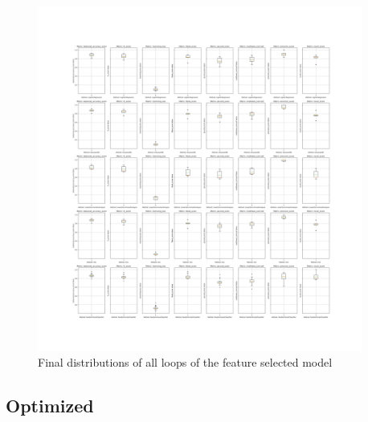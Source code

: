 \documentclass[12pt, a4paper]{article}
\begin{document}
\begin{figure}[H]
    \begin{center}
        \includegraphics[width=0.95\textwidth]{figures/RNCV/FeatureSelection/All loop outer folds boxplots.png}
        \caption{Final distributions of all loops of the feature selected model}\label{fig:fs model desc}
    \end{center}
\end{figure}

\begin{multicols}{2}

    \subsection{Optimized} \label{subsec:opted model}

\end{multicols}
\end{document}
